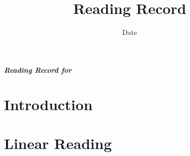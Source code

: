 


\title{Reading Record\bigskip\\
\cite{pan2003croissance}
}
\author{}
\date{Date}


\maketitle

\textbf{\textit{Reading Record for \cite{pan2003croissance}}}


\section{Introduction}




\section{Linear Reading}

















